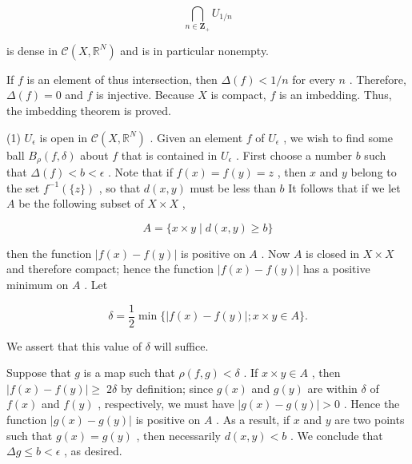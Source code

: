 \documentclass[10pt]{article}
\begin{document}
\[
\mathop{\bigcap }\limits_{{n \in  {\mathbf{Z}}_{ + }}}{U}_{1/n}
\]

is dense in \(\mathcal{C}\left( {X,{\mathbb{R}}^{N}}\right)\) and is in particular nonempty.

If \(f\) is an element of thus intersection, then \(\Delta \left( f\right)  < 1/n\) for every \(n\) . Therefore, \(\Delta \left( f\right)  = 0\) and \(f\) is injective. Because \(X\) is compact, \(f\) is an imbedding. Thus, the imbedding theorem is proved.

(1) \({U}_{\epsilon }\) is open in \(\mathcal{C}\left( {X,{\mathbb{R}}^{N}}\right)\) . Given an element \(f\) of \({U}_{\epsilon }\) , we wish to find some ball \({B}_{\rho }\left( {f,\delta }\right)\) about \(f\) that is contained in \({U}_{\epsilon }\) . First choose a number \(b\) such that \(\Delta \left( f\right)  < b < \epsilon\) . Note that if \(f\left( x\right)  = f\left( y\right)  = z\) , then \(x\) and \(y\) belong to the set \({f}^{-1}\left( {\{ z\} }\right)\) , so that \(d\left( {x,y}\right)\) must be less than \(b\) It follows that if we let \(A\) be the following subset of \(X \times  X\) ,

\[
A = \{ x \times  y \mid  d\left( {x,y}\right)  \geq  b\}
\]

then the function \(\left| {f\left( x\right)  - f\left( y\right) }\right|\) is positive on \(A\) . Now \(A\) is closed in \(X \times  X\) and therefore compact; hence the function \(\left| {f\left( x\right)  - f\left( y\right) }\right|\) has a positive minimum on \(A\) . Let

\[
\delta  = \frac{1}{2}\min \{ \left| {f\left( x\right)  - f\left( y\right) }\right| ;x \times  y \in  A\} .
\]

We assert that this value of \(\delta\) will suffice.

Suppose that \(g\) is a map such that \(\rho \left( {f,g}\right)  < \delta\) . If \(x \times  y \in  A\) , then \(\left| {f\left( x\right)  - f\left( y\right) }\right|  \geq \; {2\delta }\) by definition; since \(g\left( x\right)\) and \(g\left( y\right)\) are within \(\delta\) of \(f\left( x\right)\) and \(f\left( y\right)\) , respectively, we must have \(\left| {g\left( x\right)  - g\left( y\right) }\right|  > 0\) . Hence the function \(\left| {g\left( x\right)  - g\left( y\right) }\right|\) is positive on \(A\) . As a result, if \(x\) and \(y\) are two points such that \(g\left( x\right)  = g\left( y\right)\) , then necessarily \(d\left( {x,y}\right)  < b\) . We conclude that \({\Delta g} \leq  b < \epsilon\) , as desired.
\end{document}
